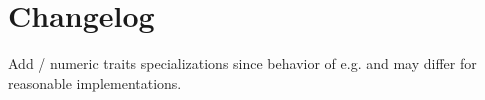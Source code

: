 \section{Changelog}
\begin{revision}
  \todo Add  / numeric traits specializations since behavior of e.g.  and  may differ for reasonable implementations.
\end{revision}
